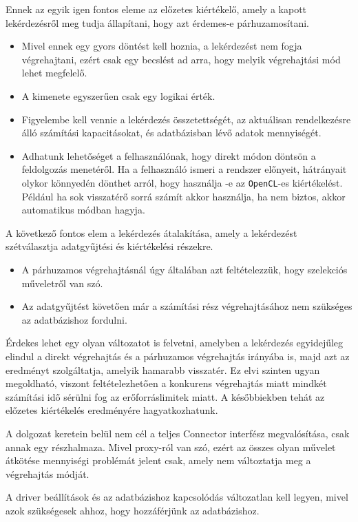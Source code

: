 Ennek az egyik igen fontos eleme az előzetes kiértékelő, amely a kapott lekérdezésről meg tudja állapítani, hogy azt érdemes-e párhuzamosítani.
\begin{itemize}
	\item Mivel ennek egy gyors döntést kell hoznia, a lekérdezést nem fogja végrehajtani, ezért csak egy becslést ad arra, hogy melyik végrehajtási mód lehet megfelelő.
	\item A kimenete egyszerűen csak egy logikai érték.
	\item Figyelembe kell vennie a lekérdezés összetettségét, az aktuálisan rendelkezésre álló számítási kapacitásokat, és adatbázisban lévő adatok mennyiségét.
	\item Adhatunk lehetőséget a felhasználónak, hogy direkt módon döntsön a feldolgozás menetéről. Ha a felhasználó ismeri a rendszer előnyeit, hátrányait olykor könnyedén dönthet arról, hogy használja -e az \texttt{OpenCL}-es kiértékelést. Például ha sok visszatérő sorrá számít akkor használja, ha nem biztos, akkor automatikus módban hagyja.
\end{itemize}

A következő fontos elem a lekérdezés átalakítása, amely a lekérdezést szétválasztja adatgyűjtési és kiértékelési részekre.
\begin{itemize}
	\item A párhuzamos végrehajtásnál úgy általában azt feltételezzük, hogy szelekciós műveletről van szó.
	\item Az adatgyűjtést követően már a számítási rész végrehajtásához nem szükséges az adatbázishoz fordulni.
\end{itemize}

Érdekes lehet egy olyan változatot is felvetni, amelyben a lekérdezés egyidejűleg elindul a direkt végrehajtás és a párhuzamos végrehajtás irányába is, majd azt az eredményt szolgáltatja, amelyik hamarabb visszatér. Ez elvi szinten ugyan megoldható, viszont feltételezhetően a konkurens végrehajtás miatt mindkét számítási idő sérülni fog az erőforráslimitek miatt. A későbbiekben tehát az előzetes kiértékelés eredményére hagyatkozhatunk.


A dolgozat keretein belül nem cél a teljes Connector interfész megvalósítása, csak annak egy részhalmaza. Mivel proxy-ról van szó, ezért az összes olyan művelet átkötése mennyiségi problémát jelent csak, amely nem változtatja meg a végrehajtás módját.

A driver beállítások és az adatbázishoz kapcsolódás változatlan kell legyen, mivel azok szükségesek ahhoz, hogy hozzáférjünk az adatbázishoz.

